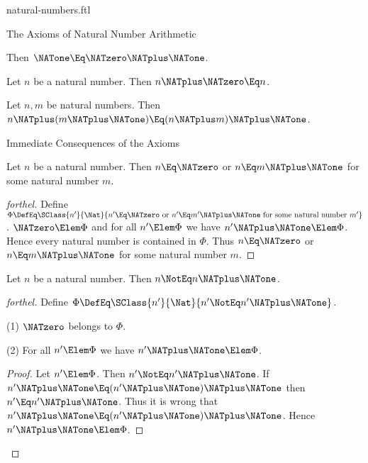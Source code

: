 \documentclass{stex}
\begin{document}
\begin{smodule}{natural-numbers.ftl}
\begin{sfragment}{The Axioms of Natural Number Arithmetic}
  \begin{axiom}[forthel]
    Then $\NATone \Eq \NATzero \NATplus \NATone$.
  \end{axiom}

  \begin{axiom}[forthel]
    Let $n$ be a natural number.
    Then $n \NATplus \NATzero \Eq n$.
  \end{axiom}

  \begin{axiom}[forthel]
    Let $n, m$ be natural numbers.
    Then $n \NATplus (m \NATplus \NATone) \Eq (n \NATplus m) \NATplus \NATone$.
  \end{axiom}
\end{sfragment}

\begin{sfragment}{Immediate Consequences of the Axioms}
  \begin{proposition}[forthel]
    Let $n$ be a natural number.
    Then $n \Eq \NATzero$ or $n \Eq m \NATplus \NATone$ for some natural number $m$.
  \end{proposition}
  \begin{proof}[forthel]
    Define $\Phi \DefEq \SClass{n'}{\Nat}{n' \Eq \NATzero\text{ or }n' \Eq m' \NATplus \NATone\text{ for some natural number }m'}$.
    $\NATzero \Elem \Phi$ and for all $n' \Elem  \Phi$ we have $n' \NATplus \NATone \Elem \Phi$.
    Hence every natural number is contained in $\Phi$.
    Thus $n \Eq \NATzero$ or $n \Eq m \NATplus \NATone$ for some natural number $m$.
  \end{proof}

  \begin{proposition}[forthel]
    Let $n$ be a natural number.
    Then $n \NotEq n \NATplus \NATone$.
  \end{proposition}
  \begin{proof}[forthel]
    Define $\Phi \DefEq \SClass{n'}{\Nat}{n' \NotEq n' \NATplus \NATone}$.

    (1) $\NATzero$ belongs to $\Phi$.

    (2) For all $n' \Elem \Phi$ we have $n' \NATplus \NATone \Elem \Phi$.
    \begin{proof}
      Let $n' \Elem \Phi$.
      Then $n' \NotEq n' \NATplus \NATone$.
      If $n' \NATplus \NATone \Eq (n' \NATplus \NATone) \NATplus \NATone$ then $n' \Eq n' \NATplus \NATone$.
      Thus it is wrong that $n' \NATplus \NATone \Eq (n' \NATplus \NATone) \NATplus \NATone$.
      Hence $n' \NATplus \NATone \Elem \Phi$.
    \end{proof}


\end{proof}
\end{sfragment}
\end{smodule}
\end{document}
